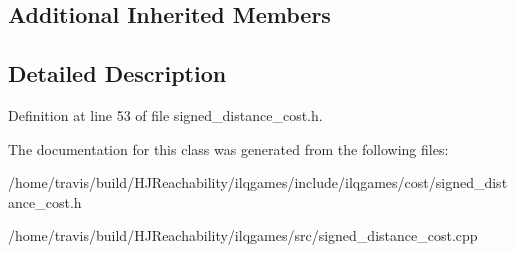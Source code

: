 \subsection*{Additional Inherited Members}


\subsection{Detailed Description}


Definition at line 53 of file signed\+\_\+distance\+\_\+cost.\+h.



The documentation for this class was generated from the following files\+:\begin{DoxyCompactItemize}
\item 
/home/travis/build/\+H\+J\+Reachability/ilqgames/include/ilqgames/cost/signed\+\_\+distance\+\_\+cost.\+h\item 
/home/travis/build/\+H\+J\+Reachability/ilqgames/src/signed\+\_\+distance\+\_\+cost.\+cpp\end{DoxyCompactItemize}
